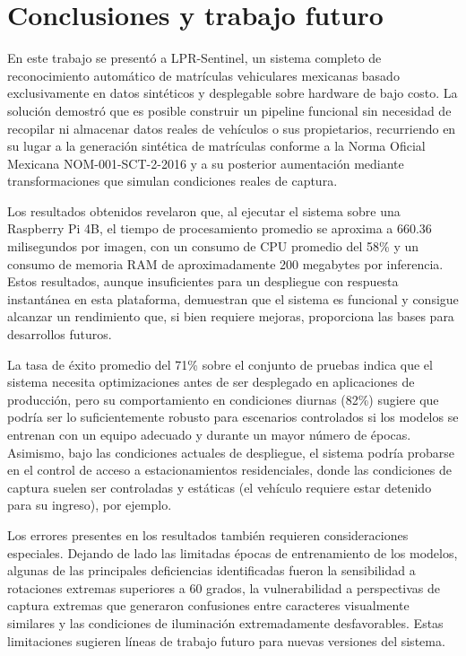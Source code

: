 \section{Conclusiones y trabajo futuro}
En este trabajo se presentó a LPR-Sentinel, un sistema completo de reconocimiento automático de matrículas vehiculares mexicanas basado exclusivamente en datos sintéticos y desplegable sobre hardware de bajo costo. La solución demostró que es posible construir un pipeline funcional sin necesidad de recopilar ni almacenar datos reales de vehículos o sus propietarios, recurriendo en su lugar a la generación sintética de matrículas conforme a la Norma Oficial Mexicana NOM-001-SCT-2-2016 y a su posterior aumentación mediante transformaciones que simulan condiciones reales de captura.

Los resultados obtenidos revelaron que, al ejecutar el sistema sobre una Raspberry Pi 4B, el tiempo de procesamiento promedio se aproxima a 660.36 milisegundos por imagen, con un consumo de CPU promedio del 58\% y un consumo de memoria RAM de aproximadamente 200 megabytes por inferencia. Estos resultados, aunque insuficientes para un despliegue con respuesta instantánea en esta plataforma, demuestran que el sistema es funcional y consigue alcanzar un rendimiento que, si bien requiere mejoras, proporciona las bases para desarrollos futuros.

La tasa de éxito promedio del 71\% sobre el conjunto de pruebas indica que el sistema necesita optimizaciones antes de ser desplegado en aplicaciones de producción, pero su comportamiento en condiciones diurnas (82\%) sugiere que podría ser lo suficientemente robusto para escenarios controlados si los modelos se entrenan con un equipo adecuado y durante un mayor número de épocas. Asimismo, bajo las condiciones actuales de despliegue, el sistema podría probarse en el control de acceso a estacionamientos residenciales, donde las condiciones de captura suelen ser controladas y estáticas (el vehículo requiere estar detenido para su ingreso), por ejemplo.

Los errores presentes en los resultados también requieren consideraciones especiales. Dejando de lado las limitadas épocas de entrenamiento de los modelos, algunas de las principales deficiencias identificadas fueron la sensibilidad a rotaciones extremas superiores a 60 grados, la vulnerabilidad a perspectivas de captura extremas que generaron confusiones entre caracteres visualmente similares y las condiciones de iluminación extremadamente desfavorables. Estas limitaciones sugieren líneas de trabajo futuro para nuevas versiones del sistema.

